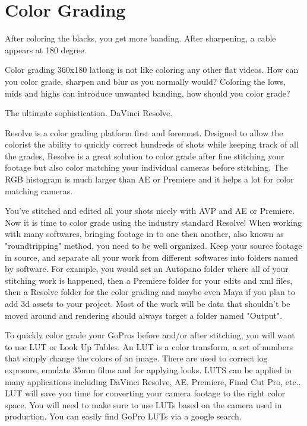 \chapter{Color Grading}
\pagecolor{white}
\label{chap:54}
\begin{fullwidth}

\problem

{\large After coloring the blacks, you get more banding. After sharpening, a cable appears at 180 degree. \par}

Color grading 360x180 latlong is not like coloring any other flat videos. How can you color grade, sharpen and blur as you normally would? Coloring the lows, mids and highs can introduce unwanted banding, how should you color grade?

\solution

{\large The ultimate sophistication. DaVinci Resolve. \par}

Resolve is a color grading platform first and foremost. Designed to allow the colorist the ability to quickly correct hundreds of shots while keeping track of all the grades, Resolve is a great solution to color grade after fine stitching your footage but also color matching your individual cameras before stitching. The RGB histogram is much larger than AE or Premiere and it helps a lot for color matching cameras.


You've stitched and edited all your shots nicely with AVP and AE or Premiere. Now it is time to color grade using the industry standard Resolve! When working with many softwares, bringing footage in to one then another, also known as "roundtripping" method, you need to be well organized. Keep your source footage in source, and separate all your work from different softwares into folders named by software. For example, you would set an Autopano folder where all of your stitching work is happened, then a Premiere folder for your edits and xml files, then a Resolve folder for the color grading and maybe even Maya if you plan to add 3d assets to your project. Most of the work will be data that shouldn't be moved around and rendering should always target a folder named "Output". 


To quickly color grade your GoPros before and/or after stitching, you will want to use LUT or Look Up Tables. An LUT is a color transform, a set of numbers that simply change the colors of an image. There are used to correct log exposure, emulate 35mm films and for applying looks. LUTS can be applied in many applications including DaVinci Resolve, AE, Premiere, Final Cut Pro, etc.. LUT will save you time for converting your camera footage to the right color space. You will need to make sure to use LUTs based on the camera used in production. You can easily find GoPro LUTs via a google search.


\end{fullwidth}
